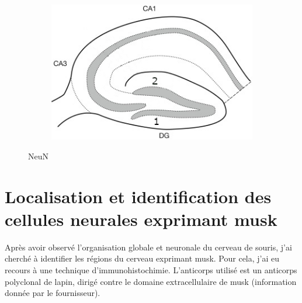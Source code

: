 \begin{figure}[h]
\begin{center}
\begin{subfigure}[h]{0.329\textwidth}
			\end{subfigure}
			\begin{subfigure}[h]{0.329\textwidth}
				\caption{}
				\label{fig:hippIllu}
				\includegraphics[width=\textwidth]{./Images/HippSchema.jpg}
			\end{subfigure}
			\begin{subfigure}[h]{0.49\textwidth}
			\end{subfigure}
		\end{center}
		\caption{NeuN}
		\label{fig:NeuNResultat}
	\end{figure}
\FloatBarrier
	
\section{Localisation et identification des cellules neurales exprimant \acrshort{musk}}
	\label{ssec:musk}
	Après avoir observé l'organisation globale et neuronale du cerveau de souris, j'ai cherché à identifier les régions du cerveau exprimant \gls{musk}. Pour cela, j'ai eu recours à une technique d'immunohistochimie. L'anticorps utilisé est un anticorps polyclonal de lapin, dirigé contre le domaine extracellulaire de \gls{musk} (information donnée par le fournisseur).
	
